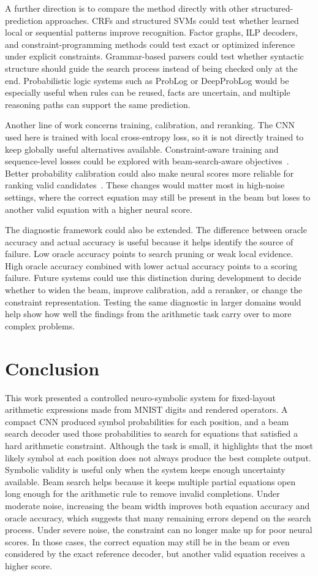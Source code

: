 \documentclass[12pt]{article}
\begin{document}
A further direction is to compare the method directly with other structured-prediction approaches. CRFs and structured SVMs could test whether learned local or sequential patterns improve recognition. Factor graphs, ILP decoders, and constraint-programming methods could test exact or optimized inference under explicit constraints. Grammar-based parsers could test whether syntactic structure should guide the search process instead of being checked only at the end. Probabilistic logic systems such as ProbLog or DeepProbLog would be especially useful when rules can be reused, facts are uncertain, and multiple reasoning paths can support the same prediction.

Another line of work concerns training, calibration, and reranking. The CNN used here is trained with local cross-entropy loss, so it is not directly trained to keep globally useful alternatives available. Constraint-aware training and sequence-level losses could be explored with beam-search-aware objectives~\cite{wiseman2016}. Better probability calibration could also make neural scores more reliable for ranking valid candidates~\cite{guo2017}. These changes would matter most in high-noise settings, where the correct equation may still be present in the beam but loses to another valid equation with a higher neural score.

The diagnostic framework could also be extended. The difference between oracle accuracy and actual accuracy is useful because it helps identify the source of failure. Low oracle accuracy points to search pruning or weak local evidence. High oracle accuracy combined with lower actual accuracy points to a scoring failure. Future systems could use this distinction during development to decide whether to widen the beam, improve calibration, add a reranker, or change the constraint representation. Testing the same diagnostic in larger domains would help show how well the findings from the arithmetic task carry over to more complex problems.

\section{Conclusion}
This work presented a controlled neuro-symbolic system for fixed-layout arithmetic expressions made from MNIST digits and rendered operators. A compact CNN produced symbol probabilities for each position, and a beam search decoder used those probabilities to search for equations that satisfied a hard arithmetic constraint. Although the task is small, it highlights that the most likely symbol at each position does not always produce the best complete output. Symbolic validity is useful only when the system keeps enough uncertainty available. Beam search helps because it keeps multiple partial equations open long enough for the arithmetic rule to remove invalid completions. Under moderate noise, increasing the beam width improves both equation accuracy and oracle accuracy, which suggests that many remaining errors depend on the search process. Under severe noise, the constraint can no longer make up for poor neural scores. In those cases, the correct equation may still be in the beam or even considered by the exact reference decoder, but another valid equation receives a higher score.
\end{document}
